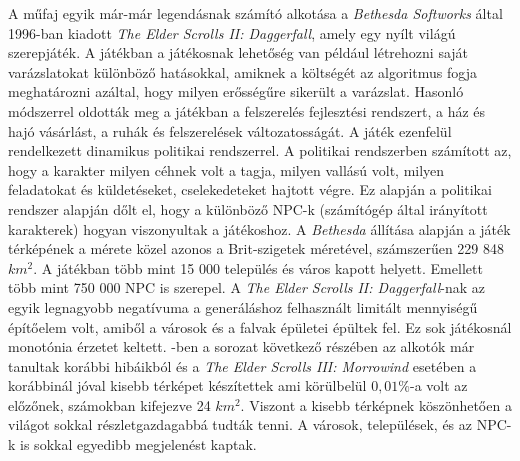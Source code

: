 \noindent A műfaj egyik már-már legendásnak számító alkotása a \textit{Bethesda Softworks} által 1996-ban kiadott \textit{The Elder Scrolls II: Daggerfall}, amely egy nyílt világú szerepjáték. A játékban a játékosnak lehetőség van például létrehozni saját varázslatokat különböző hatásokkal, amiknek a költségét az algoritmus fogja meghatározni azáltal, hogy milyen erősségűre sikerült a varázslat. Hasonló módszerrel oldották meg a játékban a felszerelés fejlesztési rendszert, a ház és hajó vásárlást, a ruhák és felszerelések változatosságát. A játék ezenfelül rendelkezett dinamikus politikai rendszerrel. A politikai rendszerben számított az,  hogy a karakter milyen céhnek volt a tagja, milyen vallású volt, milyen feladatokat és küldetéseket, cselekedeteket hajtott végre. Ez alapján a politikai rendszer alapján dőlt el, hogy a különböző NPC-k (számítógép által irányított karakterek) hogyan viszonyultak a játékoshoz. 
\newline
\newline A \textit{Bethesda} állítása alapján a játék térképének a mérete közel azonos a Brit-szigetek méretével, számszerűen 229 848 $km^2$. A játékban több mint 15 000 település és város kapott helyett. Emellett több mint 750 000 NPC is szerepel. 
\newline
\newline A \textit{The Elder Scrolls II: Daggerfall}-nak az egyik legnagyobb negatívuma a generáláshoz felhasznált limitált mennyiségű építőelem volt, amiből a városok és a falvak épületei épültek fel. Ez sok játékosnál monotónia érzetet keltett. 
\newline
{}-ben a sorozat következő részében az alkotók már tanultak korábbi hibáikból és a \textit{The Elder Scrolls III: Morrowind} esetében a korábbinál jóval kisebb térképet készítettek ami körülbelül $0,01 \%$-a volt az előzőnek, számokban kifejezve 24 $km^2$. Viszont a kisebb térképnek köszönhetően a világot sokkal részletgazdagabbá tudták tenni. A városok, települések, és az NPC-k is sokkal egyedibb megjelenést kaptak.
\newline
